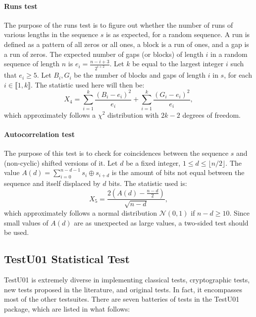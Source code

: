 \paragraph{Runs test}

The purpose of the runs test is to figure out whether the number of runs of various lengths in the sequence $s$ is as expected, for a random sequence. A run is defined as a pattern of all zeros or all ones, a block is a run of ones, and a gap is a run of zeros. The expected number of gaps (or blocks) of length $i$ in a random sequence of length $n$ is $e_i = \frac{n-i+3}{2^{i+2}}$. Let $k$ be equal to the largest integer $i$ such that $e_i \geqslant 5$. Let
$B_i , G_i$ be the number of blocks and gaps of length $i$ in $s$, for each $i \in \llbracket 1, k\rrbracket$. The statistic used here will then be:
\begin{equation*}
\displaystyle{X_4=\sum^k_{i=1}\frac{(B_i-e_i)^2}{e_i}+\sum^k_{i=1}\frac{(G_i-e_i)^2}{e_i}},
\end{equation*}
\noindent which approximately follows a $\chi^2$ distribution with $2k - 2$ degrees of freedom.

\paragraph{Autocorrelation test}

The purpose of this test is to check for coincidences between the sequence $s$ and (non-cyclic) shifted versions of it. Let $d$ be a fixed integer, $ 1 \leqslant d \leqslant \lfloor n/2 \rfloor$. The value $A(d) = \sum_{i=0}^{n-d-1} s_i\oplus s_{i+d}$ is the amount of bits not equal between the sequence and itself displaced by $d$ bits. The statistic used is:
\begin{equation*}
X_5=\dfrac{2 \left(A(d)-\frac{n-d}{2}\right)}{\sqrt{n-d}},
\end{equation*}
which approximately follows a normal distribution $\mathcal{N}(0, 1)$ if $n-d \geqslant 10$. Since small values of $A(d)$ are as unexpected as large values, a two-sided test should be used.

\subsection{TestU01 Statistical Test}
\label{Testing a generator}

TestU01 is extremely diverse in implementing classical tests,
cryptographic tests, new tests proposed in the literature, and original tests.
In fact, it encompasses most of the other testsuites. 
There are seven batteries of tests in the TestU01 package, which are listed in what follows:

